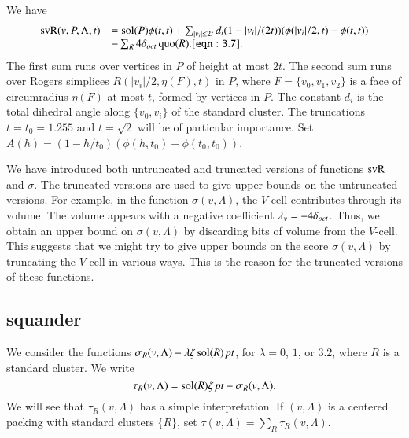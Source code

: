 We have
    \begin{equation}
    \begin{array}{lll}
    \op{svR}(v,P,\Lambda,t) &=
    \sol(P)\phi(t,t)
    +\sum_{|v_i|\le 2t} d_i (1-|v_i|/(2t)) (\phi(|v_i|/2,t)-
    \phi(t,t)) \\
    &-\sum_{R} 4\doct \quo(R).
    \tlabel{eqn:3.7}
    \end{array}
    \end{equation}
The first sum runs over vertices in $P$ of height at most $2t$.
The second sum runs over Rogers simplices $R(|v_i|/2,\eta(F),t)$
in $P$, where $F=\{v_0,v_1,v_2\}$ is a face of circumradius
$\eta(F)$ at most $t$, formed by vertices in $P$.  The constant
$d_i$ is the total dihedral angle along $\{v_0,v_i\}$ of the
standard cluster. The truncations $t=t_0=1.255$ and $t=\sqrt2$
will be of particular importance.
    Set $A(h) = (1-h/t_0) (\phi(h,t_0)-\phi(t_0,t_0))$.

\begin{remark}  We have introduced both untruncated and truncated
versions of functions ${\operatorname{svR}}$ and $\sigma$.  The truncated versions
are used to give upper bounds on the untruncated versions.  For
example,  in the function $\sigma(v,\Lambda)$, the $V$-cell contributes
through its volume.  The volume
appears with a negative coefficient 
$\lambda_v=-4\delta_{oct}$.  Thus, we obtain an
upper bound on $\sigma(v,\Lambda)$ by discarding bits of volume from the
$V$-cell.   This suggests that we might try to give upper bounds
on the score $\sigma(v,\Lambda)$ by truncating the $V$-cell in various
ways. This is the reason for the truncated versions of these
functions.
\end{remark}




\subsection{squander}%



We consider the functions
    $\sigma_R(v,\Lambda)-\lambda\zeta\operatorname{sol}(R)\,\hbox{\it pt}$,
for $\lambda=0$, $1$, or $3.2$, where $R$ is a standard cluster.
We write
    $$
    \tau_R(v,\Lambda) = \operatorname{sol}(R)\zeta\,\hbox{\it pt} -
    \sigma_R(v,\Lambda).
    $$
We will see that $\tau_R(v,\Lambda)$ has a simple interpretation.  If $(v,\Lambda)$
is a centered packing with standard clusters $\{R\}$, set $\tau(v,\Lambda)
= \sum_{R}\tau_R(v,\Lambda)$.
\smallskip



